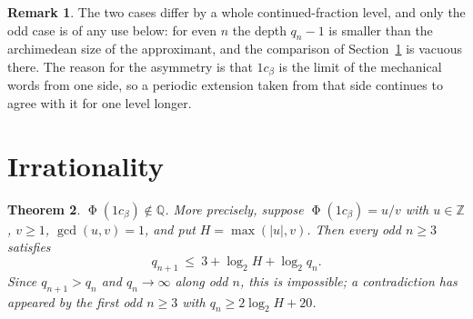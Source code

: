 \documentclass[11pt,reqno]{amsart}
\theoremstyle{plain}
\newtheorem{theorem}{Theorem}[section]
\theoremstyle{definition}
\newtheorem{remark}[theorem]{Remark}
\newcommand{\Z}{\mathbb{Z}}
\newcommand{\Q}{\mathbb{Q}}
\DeclareMathOperator{\Ph}{\Phi}
\begin{document}
\begin{remark}
The two cases differ by a whole continued-fraction level, and only the odd case
is of any use below: for even $n$ the depth $q_n-1$ is smaller than the
archimedean size of the approximant, and the comparison of
Section~\ref{sec:main} is vacuous there. The reason for the asymmetry is that
$1c_\beta$ is the limit of the mechanical words from one side, so a periodic
extension taken from that side continues to agree with it for one level longer.
\end{remark}

\section{Irrationality}\label{sec:main}

\begin{theorem}\label{thm:main}
$\Ph(1c_\beta)\notin\Q$. More precisely, suppose $\Ph(1c_\beta)=u/v$ with
$u\in\Z$, $v\ge1$, $\gcd(u,v)=1$, and put $H=\max(|u|,v)$. Then every odd
$n\ge3$ satisfies
\begin{equation}\label{eq:key}
q_{n+1}\ \le\ 3+\log_2 H+\log_2 q_n .
\end{equation}
Since $q_{n+1}>q_n$ and $q_n\to\infty$ along odd $n$, this is impossible; a
contradiction has appeared by the first odd $n\ge 3$ with
$q_n\ge 2\log_2H+20$.
\end{theorem}
\end{document}
